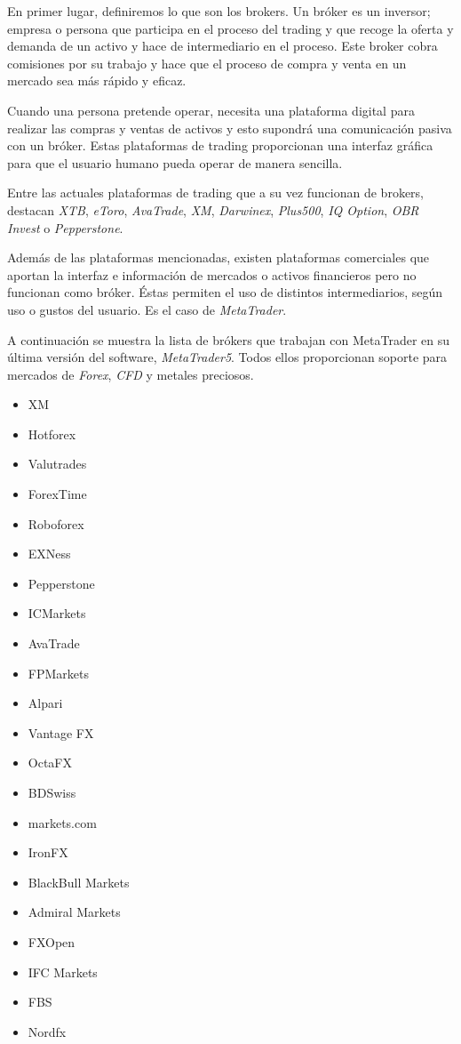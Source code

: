 En primer lugar, definiremos lo que son los brokers. Un bróker es un inversor; empresa o persona que participa en el proceso del trading y que recoge la oferta y demanda de un activo y hace de intermediario en el proceso. Este broker cobra comisiones por su trabajo y hace que el proceso de compra y venta en un mercado sea más rápido y eficaz. \newline

Cuando una persona pretende operar, necesita una plataforma digital para realizar las compras y ventas de activos y esto supondrá una comunicación pasiva con un bróker. Estas plataformas de trading proporcionan una interfaz gráfica para que el usuario humano pueda operar de manera sencilla. \newline

Entre las actuales plataformas de trading que a su vez funcionan de brokers, destacan \textit{XTB}, \textit{eToro}, \textit{AvaTrade}, \textit{XM}, \textit{Darwinex}, \textit{Plus500}, \textit{IQ Option}, \textit{OBR Invest} o \textit{Pepperstone}. \newline

Además de las plataformas mencionadas, existen plataformas comerciales que aportan la interfaz e información de mercados o activos financieros pero no funcionan como bróker. Éstas permiten el uso de distintos intermediarios, según uso o gustos del usuario. Es el caso de \textit{MetaTrader}. \newline

A continuación se muestra la lista de brókers que trabajan con MetaTrader en su última versión del software, \textit{MetaTrader5}. Todos ellos proporcionan soporte para mercados de \textit{Forex}, \textit{CFD} y metales preciosos. \newline

\begin{multicols}{2}
	\begin{itemize}
		\item XM
		\item Hotforex
		\item Valutrades
		\item ForexTime
		\item Roboforex
		\item EXNess
		\item Pepperstone
		\item ICMarkets
		\item AvaTrade
		\item FPMarkets
		\item Alpari
		\item Vantage FX
		\item OctaFX
		\item BDSwiss
		\item markets.com
		\item IronFX
		\item BlackBull Markets
		\item Admiral Markets
		\item FXOpen
		\item IFC Markets
		\item FBS
		\item Nordfx
	\end{itemize}
\end{multicols}


